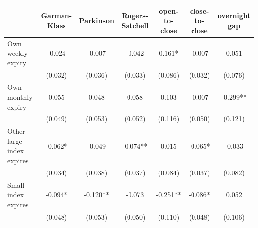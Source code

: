 \begin{tabular}{lcccccc}
\toprule
 & Garman-Klass & Parkinson & Rogers-Satchell & open-to-close & close-to-close & overnight gap \\
\midrule
Own weekly expiry & -0.024 & -0.007 & -0.042 & 0.161* & -0.007 & 0.051 \\
 & (0.032) & (0.036) & (0.033) & (0.086) & (0.032) & (0.076) \\
Own monthly expiry & 0.055 & 0.048 & 0.058 & 0.103 & -0.007 & -0.299** \\
 & (0.049) & (0.053) & (0.052) & (0.116) & (0.050) & (0.121) \\
Other large index expires & -0.062* & -0.049 & -0.074** & 0.015 & -0.065* & -0.033 \\
 & (0.034) & (0.038) & (0.037) & (0.084) & (0.037) & (0.082) \\
Small index expires & -0.094* & -0.120** & -0.073 & -0.251** & -0.086* & 0.052 \\
 & (0.048) & (0.053) & (0.050) & (0.110) & (0.048) & (0.106) \\
\bottomrule
\end{tabular}